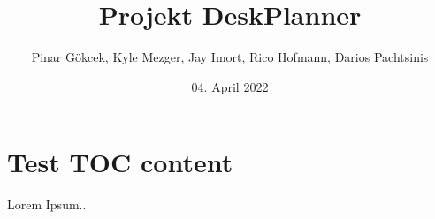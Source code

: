 \documentclass{article}
\title{Projekt DeskPlanner}
\author{Pinar Gökcek, Kyle Mezger, Jay Imort, Rico Hofmann, Darios Pachtsinis}
\date{04. April 2022}
\begin{document}
\begin{titlepage}
    \centering
    \maketitle

    \vfill

\end{titlepage}

\tableofcontents

\section{Test TOC content}
Lorem Ipsum..

% 


\end{document}
